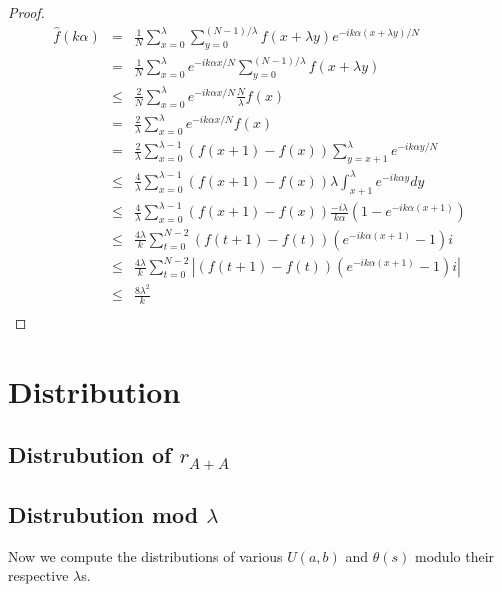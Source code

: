 \documentclass{article}
\theoremstyle{definition}
\theoremstyle{remark}
\numberwithin{equation}{section}
\begin{document}
{\begin{proof}
\begin{eqnarray*}
  \widehat{f}(k\alpha) &=& \frac{1}{N}\sum_{x=0}^{\lambda}\sum_{y=0}^{(N-1)/\lambda}f(x+\lambda y)e^{-i k\alpha (x+\lambda y)/N}\\
                       &=& \frac{1}{N}\sum_{x=0}^{\lambda} e^{-i k\alpha x/N} \sum_{y=0}^{(N-1)/\lambda}f(x+\lambda y)\\
                       &\leq& \frac{2}{N}\sum_{x=0}^{\lambda} e^{-i k\alpha x/N} \frac{N}{\lambda} f(x)\\
                       &=& \frac{2}{\lambda}\sum_{x=0}^{\lambda} e^{-i k\alpha x/N} f(x)\\
                       &=& \frac{2}{\lambda}\sum_{x=0}^{\lambda-1} (f(x+1)-f(x))\sum_{y=x+1}^\lambda e^{-i k\alpha y/N}\\
                       &\leq& \frac{4}{\lambda}\sum_{x=0}^{\lambda-1} (f(x+1)-f(x)) \lambda \int_{x+1}^\lambda e^{-i k\alpha y}dy\\
                       &\leq& \frac{4}{\lambda}\sum_{x=0}^{\lambda-1} (f(x+1)-f(x)) \frac{-i\lambda}{k\alpha}(1-e^{-i k\alpha (x+1)})\\
                       &\leq& \frac{4\lambda}{k}\sum_{t=0}^{N-2}(f(t+1)-f(t))(e^{-i k\alpha (x+1)}-1)i\\
                       &\leq& \frac{4\lambda}{k}\sum_{t=0}^{N-2}|(f(t+1)-f(t))(e^{-i k\alpha (x+1)}-1)i|\\
                       &\leq& \frac{8\lambda^2}{k}\\
\end{eqnarray*}

\end{proof}

\section{Distribution}



\subsection{Distrubution of $r_{A+A}$}



\subsection{Distrubution mod $\lambda$}

Now we compute the distributions of various $U(a,b)$ and $\theta(s)$
modulo their respective $\lambda$s.

}
\end{document}
